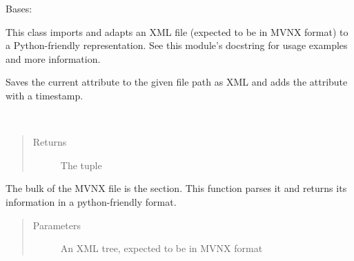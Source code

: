\documentclass[letterpaper,10pt,english,openany,oneside]{sphinxmanual}
\begin{document}
\begin{fulllineitems}
\label{\detokenize{io_anim_mvnx:io_anim_mvnx.mvnx.Mvnx}}
Bases: 

This class imports and adapts an XML file (expected to be in MVNX format)
to a Python-friendly representation. See this module’s docstring for usage
examples and more information.

\begin{fulllineitems}
\label{\detokenize{io_anim_mvnx:io_anim_mvnx.mvnx.Mvnx.export}}
Saves the current  attribute to the given file path as XML and
adds the  attribute with
a timestamp.

\end{fulllineitems}


\begin{fulllineitems}
\label{\detokenize{io_anim_mvnx:io_anim_mvnx.mvnx.Mvnx.extract_frame_info}}~\begin{quote}\begin{description}
\item[{Returns}] \leavevmode
The tuple 

\end{description}\end{quote}

\end{fulllineitems}


\begin{fulllineitems}
\label{\detokenize{io_anim_mvnx:io_anim_mvnx.mvnx.Mvnx.extract_frames}}
The bulk of the MVNX file is the  section.
This function parses it and returns its information in a
python-friendly format.
\begin{quote}\begin{description}
\item[{Parameters}] \leavevmode
{} \textendash{} An XML tree, expected to be in MVNX format


\end{description}
\end{quote}
\end{fulllineitems}
\end{fulllineitems}
\end{document}
